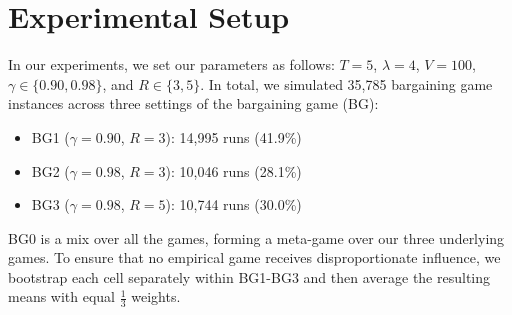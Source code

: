 \documentclass{article}
\theoremstyle{plain}
\theoremstyle{definition}
\theoremstyle{remark}
\begin{document}
\section{Experimental Setup}
In our experiments, we set our parameters as follows: $T=5$, $\lambda=4$, $V=100$, $\gamma \in \{0.90,0.98\}$, and $R \in \{3,5\}$. In total, we simulated 35,785 bargaining game instances across three settings of the bargaining game (BG):
\begin{itemize}
    \item BG1 ($\gamma=0.90$, $R=3$): 14,995 runs (41.9\%)
    \item BG2 ($\gamma=0.98$, $R=3$): 10,046 runs (28.1\%)
    \item BG3 ($\gamma=0.98$, $R=5$): 10,744 runs (30.0\%) 
\end{itemize}
 
BG0 is a mix over all the games, forming a meta-game over our three underlying games. To ensure that no empirical game receives disproportionate influence, we bootstrap each cell separately within BG1-BG3 and then average the resulting means with equal $\frac{1}{3}$ weights.
\end{document}
